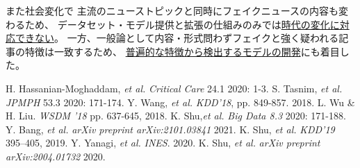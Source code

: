また社会変化で
主流のニューストピックと同時にフェイクニュースの内容も変わるため、
データセット・モデル提供と拡張の仕組みのみでは\underline{時代の変化に対応できない}。
一方、一般論として内容・形式問わずフェイクと強く疑われる記事の特徴は一致するため、
\underline{普遍的な特徴から検出するモデルの開発}にも着目した。


{\footnotesize 
\begin{twobibliography}{99}
    \setlength{\parskip}{0cm}
    \setlength{\itemsep}{0cm}
     H. Hassanian-Moghaddam, \textit{et al.} \textit{Critical Care} 24.1 2020: 1-3.
     S. Tasnim, \textit{et al.} \textit{JPMPH} 53.3 2020: 171-174.
     Y. Wang, \textit{et al.} \textit{KDD'18}, pp. 849-857. 2018.
     L. Wu \& H. Liu. \textit{WSDM '18}  pp. 637-645, 2018.
     K. Shu,\textit{et al.} \textit{Big Data 8.3} 2020: 171-188.
     Y. Bang, \textit{et al.} \textit{arXiv preprint arXiv:2101.03841} 2021.
     K. Shu, \textit{et al.} \textit{KDD'19} 395–405, 2019.
     Y. Yanagi, \textit{et al.} \textit{INES}. 2020.
     K. Shu, \textit{et al.}  \textit{arXiv preprint arXiv:2004.01732} 2020.
\end{twobibliography}
}


